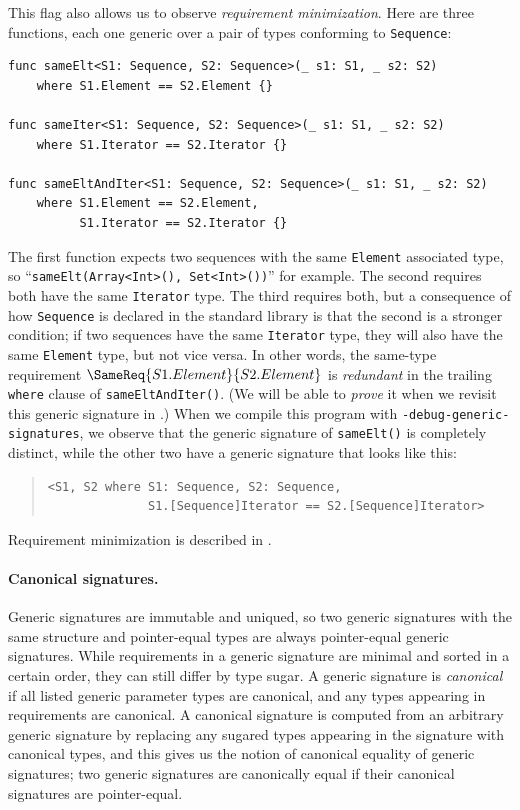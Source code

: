\documentclass[../generics]{subfiles}
\begin{document}
This flag also allows us to observe \emph{requirement minimization}. Here are three functions, each one generic over a pair of types conforming to \texttt{Sequence}:
\begin{Verbatim}
func sameElt<S1: Sequence, S2: Sequence>(_ s1: S1, _ s2: S2)
    where S1.Element == S2.Element {}

func sameIter<S1: Sequence, S2: Sequence>(_ s1: S1, _ s2: S2)
    where S1.Iterator == S2.Iterator {}

func sameEltAndIter<S1: Sequence, S2: Sequence>(_ s1: S1, _ s2: S2)
    where S1.Element == S2.Element,
          S1.Iterator == S2.Iterator {}
\end{Verbatim}
The first function expects two sequences with the same \texttt{Element} associated type, so ``\verb|sameElt(Array<Int>(), Set<Int>())|'' for example. The second requires both have the same \texttt{Iterator} type. The third requires both, but a consequence of how \texttt{Sequence} is declared in the standard library is that the second is a stronger condition; if two sequences have the same \texttt{Iterator} type, they will also have the same \texttt{Element} type, but not vice versa. In other words, the same-type requirement $\SameReq{S1.Element}{S2.Element}$ is \emph{redundant} in the trailing \texttt{where} clause of \texttt{sameEltAndIter()}. (We will be able to \emph{prove} it when we revisit this generic signature in .) When we compile this program with \texttt{-debug-generic-signatures}, we observe that the generic signature of \texttt{sameElt()} is completely distinct, while the other two have a generic signature that looks like this:
\begin{quote}
\begin{verbatim}
<S1, S2 where S1: Sequence, S2: Sequence,
              S1.[Sequence]Iterator == S2.[Sequence]Iterator>
\end{verbatim}
\end{quote}
Requirement minimization is described in .

\paragraph{Canonical signatures.}
Generic signatures are immutable and uniqued, so two generic signatures with the same structure and pointer-equal types are always pointer-equal generic signatures. While requirements in a generic signature are minimal and sorted in a certain order, they can still differ by type sugar. A generic signature is \emph{canonical} if all listed generic parameter types are canonical, and any types appearing in requirements are canonical. A canonical signature is computed from an arbitrary generic signature by replacing any sugared types appearing in the signature with canonical types, and this gives us the notion of canonical equality of generic signatures; two generic signatures are canonically equal if their canonical signatures are pointer-equal.
\end{document}
